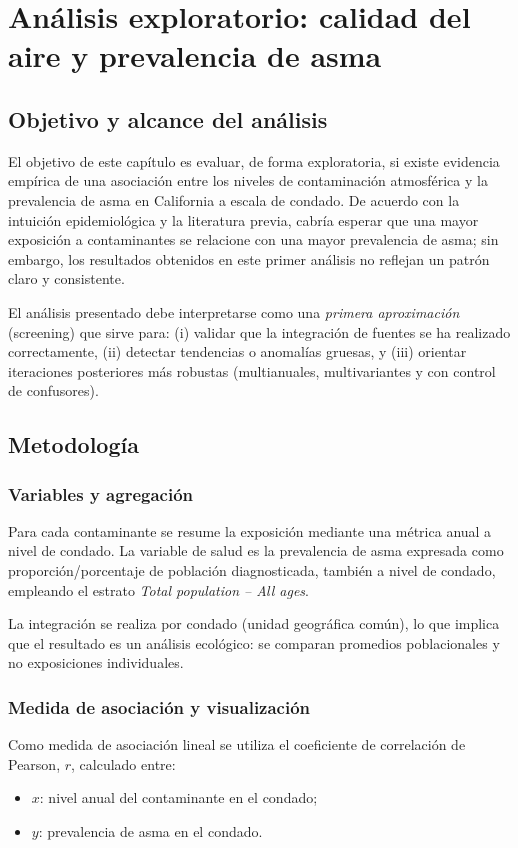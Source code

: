 \chapter{Análisis exploratorio: calidad del aire y prevalencia de asma}
\label{ch:analisis}

\section{Objetivo y alcance del análisis}
El objetivo de este capítulo es evaluar, de forma exploratoria, si existe evidencia empírica de una asociación
entre los niveles de contaminación atmosférica y la prevalencia de asma en California a escala de condado.
De acuerdo con la intuición epidemiológica y la literatura previa, cabría esperar que una mayor exposición
a contaminantes se relacione con una mayor prevalencia de asma; sin embargo, los resultados obtenidos en
este primer análisis no reflejan un patrón claro y consistente.

El análisis presentado debe interpretarse como una \textit{primera aproximación} (screening) que sirve para:
(i) validar que la integración de fuentes se ha realizado correctamente, (ii) detectar tendencias o anomalías
gruesas, y (iii) orientar iteraciones posteriores más robustas (multianuales, multivariantes y con control de
confusores).

\section{Metodología}
\subsection{Variables y agregación}
Para cada contaminante se resume la exposición mediante una métrica anual a nivel de condado. La variable
de salud es la prevalencia de asma expresada como proporción/porcentaje de población diagnosticada, también
a nivel de condado, empleando el estrato \textit{Total population -- All ages}.

La integración se realiza por condado (unidad geográfica común), lo que implica que el resultado es un
análisis ecológico: se comparan promedios poblacionales y no exposiciones individuales.

\subsection{Medida de asociación y visualización}
Como medida de asociación lineal se utiliza el coeficiente de correlación de Pearson, $r$, calculado entre:
\begin{itemize}
  \item $x$: nivel anual del contaminante en el condado;
  \item $y$: prevalencia de asma en el condado.
\end{itemize}

